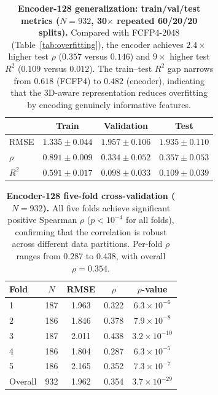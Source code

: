\documentclass{article}
\begin{document}
\begin{table}[h!]
\centering
\caption{\textbf{Encoder-128 generalization: train/val/test metrics
($N = 932$, 30$\times$ repeated 60/20/20 splits).}
Compared with FCFP4-2048 (Table~\ref{tab:overfitting}), the encoder
achieves $2.4\times$ higher test $\rho$ ($0.357$ versus $0.146$) and
$9\times$ higher test $R^{2}$ ($0.109$ versus $0.012$).  The
train--test $R^{2}$ gap narrows from $0.618$ (FCFP4) to $0.482$
(encoder), indicating that the 3D-aware representation reduces
overfitting by encoding genuinely informative features.}
\label{tab:encoder_tvt}
\begin{tabular}{@{}lccc@{}}
\toprule
& Train & Validation & Test \\
\midrule
RMSE       & $1.335 \pm 0.044$ & $1.957 \pm 0.106$ & $1.935 \pm 0.110$ \\
$\rho$     & $0.891 \pm 0.009$ & $0.334 \pm 0.052$ & $0.357 \pm 0.053$ \\
$R^{2}$    & $0.591 \pm 0.017$ & $0.098 \pm 0.033$ & $0.109 \pm 0.039$ \\
\bottomrule
\end{tabular}
\end{table}

\begin{table}[h!]
\centering
\caption{\textbf{Encoder-128 five-fold cross-validation ($N = 932$).}
All five folds achieve significant positive Spearman $\rho$ ($p < 10^{-4}$
for all folds), confirming that the correlation is robust across
different data partitions.  Per-fold $\rho$ ranges from $0.287$ to
$0.438$, with overall $\rho = 0.354$.}
\label{tab:encoder_cv5}
\begin{tabular}{@{}lcccc@{}}
\toprule
Fold & $N$ & RMSE & $\rho$ & $p$-value \\
\midrule
1 & 187 & 1.963 & 0.322 & $6.3 \times 10^{-6}$ \\
2 & 186 & 1.846 & 0.378 & $7.9 \times 10^{-8}$ \\
3 & 187 & 2.011 & 0.438 & $3.2 \times 10^{-10}$ \\
4 & 186 & 1.804 & 0.287 & $6.3 \times 10^{-5}$ \\
5 & 186 & 2.165 & 0.352 & $7.3 \times 10^{-7}$ \\
\midrule
Overall & 932 & 1.962 & 0.354 & $3.7 \times 10^{-29}$ \\
\bottomrule
\end{tabular}
\end{table}
\end{document}
